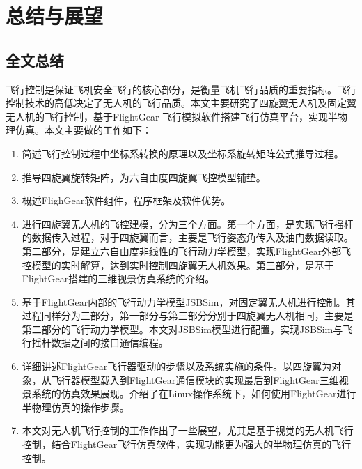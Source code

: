 
\renewcommand{\baselinestretch}{1.5}
\fontsize{12pt}{13pt}\selectfont

\chapter{总结与展望} \label{conclusion}


\section{全文总结}
飞行控制是保证飞机安全飞行的核心部分，是衡量飞机飞行品质的重要指标。飞行控制技术的高低决定了无人机的飞行品质。本文主要研究了四旋翼无人机及固定翼无人机的飞行控制，基于FlightGear 飞行模拟软件搭建飞行仿真平台，实现半物理仿真。本文主要做的工作如下：
%
\begin{enumerate}
	\item 简述飞行控制过程中坐标系转换的原理以及坐标系旋转矩阵公式推导过程。
	\item 推导四旋翼旋转矩阵，为六自由度四旋翼飞控模型铺垫。
	\item 概述FlighGear软件组件，程序框架及软件优势。
	\item 进行四旋翼无人机的飞控建模，分为三个方面。第一个方面，是实现飞行摇杆的数据传入过程，对于四旋翼而言，主要是飞行姿态角传入及油门数据读取。第二部分，是建立六自由度非线性的飞行动力学模型，实现FlightGear外部飞控模型的实时解算，达到实时控制四旋翼无人机效果。第三部分，是基于FlightGear搭建的三维视景仿真系统的介绍。
	\item 基于FlightGear内部的飞行动力学模型JSBSim，对固定翼无人机进行控制。其过程同样分为三部分，第一部分与第三部分分别于四旋翼无人机相同，主要是第二部分的飞行动力学模型。本文对JSBSim模型进行配置，实现JSBSim与飞行摇杆数据之间的接口通信编程。
	\item 详细讲述FlightGear飞行器驱动的步骤以及系统实施的条件。以四旋翼为对象，从飞行器模型载入到FlightGear通信模块的实现最后到FlightGear三维视景系统的仿真效果展现。介绍了在Linux操作系统下，如何使用FlightGear进行半物理仿真的操作步骤。
	\item 本文对无人机飞行控制的工作作出了一些展望，尤其是基于视觉的无人机飞行控制，结合FlightGear飞行仿真软件，实现功能更为强大的半物理仿真的飞行控制。
\end{enumerate}


